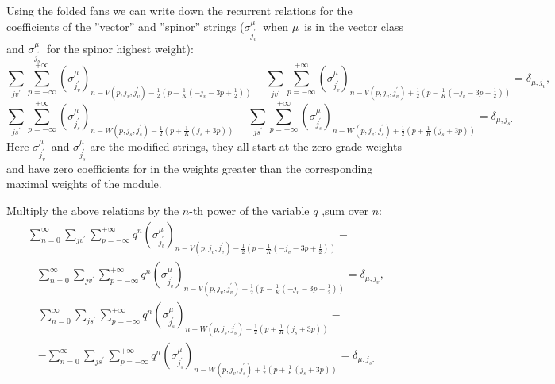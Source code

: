 \documentclass{article}
\begin{document}
Using the folded fans we can write down the recurrent relations for the
coefficients of the ''vector'' and ''spinor'' strings ($\sigma
_{j_{v}^{\prime }}^{\mu }$\ when $\mu $\ is in the vector class and $\sigma
_{j_{s}^{\prime }}^{\mu }$\ for the spinor highest weight):
\begin{equation*}
\sum_{jv^{\prime }}\sum_{p=-\infty }^{+\infty }\left( \sigma _{j_{v}^{\prime
}}^{\mu }\right) _{n-V\left( p,j_{v},j_{v}^{\prime }\right) -\frac{1}{2}%
\left( p-\frac{1}{K}\left( -j_{v}-3p+\frac{1}{2}\right) \right)
}-\sum_{jv^{\prime }}\sum_{p=-\infty }^{+\infty }\left( \sigma
_{j_{v}^{\prime }}^{\mu }\right) _{n-V\left( p,j_{v},j_{v}^{\prime }\right) +%
\frac{1}{2}\left( p-\frac{1}{K}\left( -j_{v}-3p+\frac{1}{2}\right) \right)
}=\delta _{\mu ,j_{v}},
\end{equation*}
\begin{equation*}
\sum_{js^{\prime }}\sum_{p=-\infty }^{+\infty }\left( \sigma _{j_{s}^{\prime
}}^{\mu }\right) _{n-W\left( p,j_{s},j_{s}^{\prime }\right) -\frac{1}{2}%
\left( p+\frac{1}{K}\left( j_{s}+3p\right) \right) }-\sum_{js^{\prime
}}\sum_{p=-\infty }^{+\infty }\left( \sigma _{j_{s}^{\prime }}^{\mu }\right)
_{n-W\left( p,j_{v},j_{s}^{\prime }\right) +\frac{1}{2}\left( p+\frac{1}{K}%
\left( j_{s}+3p\right) \right) }=\delta _{\mu ,j_{s}.}
\end{equation*}
Here $\sigma _{j_{v}^{\prime }}^{\mu }$\ and $\sigma _{j_{s}^{\prime }}^{\mu
}$ are the modified strings, they all start at the zero grade weights and
have zero coefficients for in the weights greater than the corresponding
maximal weights of the module.

Multiply the above relations by the $n$-th power of the variable $q$ ,sum
over $n$:
\begin{multline*}
\sum_{n=0}^{\infty }\sum_{jv^{\prime }}\sum_{p=-\infty }^{+\infty
}q^{n}\left( \sigma _{j_{v}^{\prime }}^{\mu }\right) _{n-V\left(
p,j_{v},j_{v}^{\prime }\right) -\frac{1}{2}\left( p-\frac{1}{K}\left(
-j_{v}-3p+\frac{1}{2}\right) \right) }- \\
-\sum_{n=0}^{\infty }\sum_{jv^{\prime }}\sum_{p=-\infty }^{+\infty
}q^{n}\left( \sigma _{j_{v}^{\prime }}^{\mu }\right) _{n-V\left(
p,j_{v},j_{v}^{\prime }\right) +\frac{1}{2}\left( p-\frac{1}{K}\left(
-j_{v}-3p+\frac{1}{2}\right) \right) }=\delta _{\mu ,j_{v}},
\end{multline*}
\begin{multline*}
\sum_{n=0}^{\infty }\sum_{js^{\prime }}\sum_{p=-\infty }^{+\infty
}q^{n}\left( \sigma _{j_{s}^{\prime }}^{\mu }\right) _{n-W\left(
p,j_{s},j_{s}^{\prime }\right) -\frac{1}{2}\left( p+\frac{1}{K}\left(
j_{s}+3p\right) \right) }- \\
-\sum_{n=0}^{\infty }\sum_{js^{\prime }}\sum_{p=-\infty }^{+\infty
}q^{n}\left( \sigma _{j_{s}^{\prime }}^{\mu }\right) _{n-W\left(
p,j_{v},j_{s}^{\prime }\right) +\frac{1}{2}\left( p+\frac{1}{K}\left(
j_{s}+3p\right) \right) }=\delta _{\mu ,j_{s}.}
\end{multline*}
\end{document}
